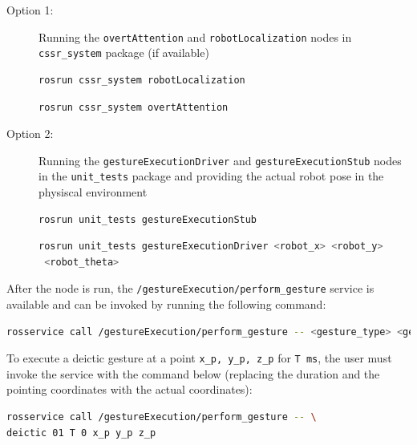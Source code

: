 \documentclass{CSSRforAfrica}
\begin{document}
\begin{description}
\item[Option 1:]
Running the \texttt{overtAttention} and \texttt{robotLocalization} nodes in \texttt{cssr\_system} package (if available)

\begin{lstlisting}[style=withoutNumbering, language=bash]
rosrun cssr_system robotLocalization
\end{lstlisting}

\begin{lstlisting}[style=withoutNumbering, language=bash]
rosrun cssr_system overtAttention
\end{lstlisting}

\item[Option 2:]
Running the \texttt{gestureExecutionDriver} and \texttt{gestureExecutionStub} nodes in the \texttt{unit\_tests} package and providing the actual robot pose in the physiscal environment

\begin{lstlisting}[style=withoutNumbering, language=bash]
rosrun unit_tests gestureExecutionStub
\end{lstlisting}

\begin{lstlisting}[style=withoutNumbering, language=bash]
rosrun unit_tests gestureExecutionDriver <robot_x> <robot_y>
 <robot_theta>
\end{lstlisting}

\end{description}


After the node is run, the \texttt{/gestureExecution/perform\_gesture} service is available and can be invoked by running the following command:


\begin{lstlisting}[style=withoutNumbering, language=bash]
rosservice call /gestureExecution/perform_gesture -- <gesture_type> <gesture_id> <gesture_duration> <bow_nod_angle> <location_x> <location_y> <location_z>
\end{lstlisting}

 To execute a deictic gesture at a point   \texttt{x\_p, y\_p, z\_p}  for \texttt{T ms}, the user must invoke the service with the command below (replacing the duration and the pointing coordinates with the actual coordinates):

\begin{lstlisting}[style=withoutNumbering, language=bash]
rosservice call /gestureExecution/perform_gesture -- \
deictic 01 T 0 x_p y_p z_p
\end{lstlisting}
\end{document}
